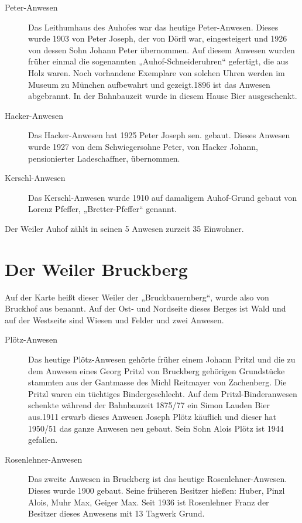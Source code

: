 \documentclass{book}
\begin{document}
\begin{description}
\item[Peter-Anwesen] Das Leithumhaus des Auhofes war das heutige Peter-Anwesen.
Dieses wurde 1903 von Peter Joseph, der von Dörfl war, eingesteigert und 1926
von dessen Sohn Johann Peter übernommen. Auf diesem Anwesen wurden früher einmal
die sogenannten „Auhof-Schneideruhren“ gefertigt, die aus Holz waren. Noch
vorhandene Exemplare von solchen Uhren werden im Museum zu München aufbewahrt
und gezeigt.1896 ist das Anwesen abgebrannt. In der Bahnbauzeit wurde in diesem
Hause Bier ausgeschenkt.

\item[Hacker-Anwesen] Das Hacker-Anwesen hat 1925 Peter Joseph sen. gebaut.
Dieses Anwesen wurde 1927 von dem Schwiegersohne Peter, von Hacker Johann,
pensionierter Ladeschaffner, übernommen.

\item[Kerschl-Anwesen] Das Kerschl-Anwesen wurde 1910 auf damaligem Auhof-Grund
gebaut von Lorenz Pfeffer, „Bretter-Pfeffer“ genannt.
\end{description}

Der Weiler Auhof zählt in seinen 5 Anwesen zurzeit 35 Einwohner.

\section{Der Weiler Bruckberg}

Auf der Karte heißt dieser Weiler der „Bruckbauernberg“, wurde also von Bruckhof
aus benannt. Auf der Ost- und Nordseite dieses Berges ist Wald und auf der
Westseite sind Wiesen und Felder und zwei Anwesen.

\begin{description}
\item[Plötz-Anwesen] Das heutige Plötz-Anwesen gehörte früher einem Johann
Pritzl und die zu dem Anwesen eines Georg Pritzl von Bruckberg gehörigen
Grundstücke stammten aus der Gantmasse des Michl Reitmayer von Zachenberg. Die
Pritzl waren ein tüchtiges Bindergeschlecht. Auf dem Pritzl-Binderanwesen
schenkte während der Bahnbauzeit 1875/77 ein Simon Lauden Bier aus.1911 erwarb
dieses Anwesen Joseph Plötz käuflich und dieser hat 1950/51 das ganze Anwesen
neu gebaut. Sein Sohn Alois Plötz ist 1944 gefallen.

\item[Rosenlehner-Anwesen] Das zweite Anwesen in Bruckberg ist das heutige
Rosenlehner-Anwesen. Dieses wurde 1900 gebaut. Seine früheren Besitzer hießen:
Huber, Pinzl Alois, Muhr Max, Geiger Max. Seit 1936 ist Rosenlehner Franz der
Besitzer dieses Anwesens mit 13 Tagwerk Grund.
\end{description}
\end{document}
